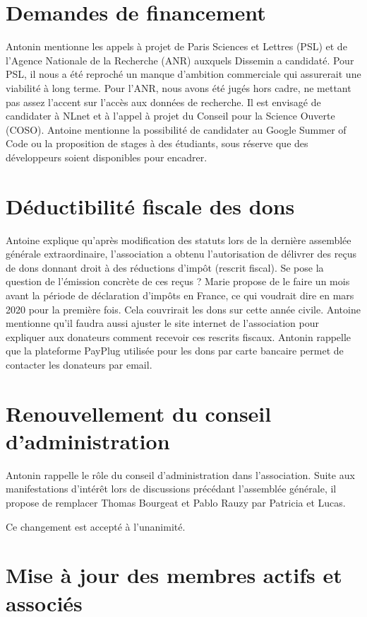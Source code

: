 \documentclass[a4paper]{article}
\begin{document}
\section{Demandes de financement}

Antonin mentionne les appels à projet de Paris Sciences et Lettres (PSL) et de l'Agence Nationale de la Recherche (ANR) auxquels  Dissemin a candidaté.
Pour PSL, il nous a été reproché un manque d'ambition commerciale qui assurerait une viabilité à long terme. Pour l'ANR, nous avons été jugés hors cadre, ne mettant pas assez l'accent sur l'accès aux données de recherche.
Il est envisagé de candidater à NLnet et à l'appel à projet du Conseil pour la Science Ouverte (COSO).
Antoine mentionne la possibilité de candidater au Google Summer of Code ou la proposition de stages à des étudiants, sous réserve que des développeurs soient disponibles pour encadrer.

\section{Déductibilité fiscale des dons}
Antoine explique qu'après modification des statuts lors de la dernière assemblée générale extraordinaire, l'association a obtenu l'autorisation de délivrer des reçus de dons donnant droit à des réductions d'impôt (rescrit fiscal).
Se pose la question de l'émission concrète de ces reçus ?
Marie propose de le faire un mois avant la période de déclaration d'impôts en France, ce qui voudrait dire en mars 2020 pour la première fois. Cela couvrirait les dons sur cette année civile. Antoine mentionne qu'il faudra aussi ajuster le site internet de
l'association pour expliquer aux donateurs comment recevoir ces rescrits fiscaux.
Antonin rappelle que la plateforme PayPlug utilisée pour les dons par carte bancaire
permet de contacter les donateurs par email.

\section{Renouvellement du conseil d'administration}

Antonin rappelle le rôle du conseil d'administration dans l'association.
Suite aux manifestations d'intérêt lors de discussions précédant l'assemblée générale,
il propose de remplacer Thomas Bourgeat et Pablo Rauzy par Patricia et Lucas.

Ce changement est accepté à l'unanimité.

\section{Mise à jour des membres actifs et associés}
\end{document}
